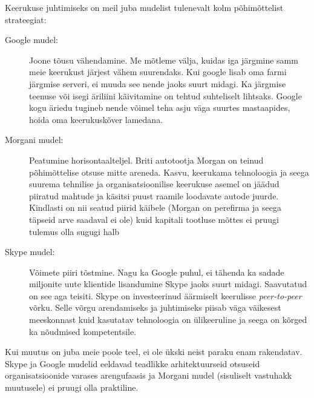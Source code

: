 Keerukuse juhtimiseks on meil juba mudelist tulenevalt kolm põhimõttelist strateegiat:
	\begin{description}
		\item[Google mudel:] Joone tõusu vähendamine. Me mõtleme välja, kuidas iga järgmine samm meie keerukust järjest vähem suurendaks. Kui google lisab oma farmi järgmise serveri, ei muuda see nende jaoks suurt midagi. Ka järgmise teenuse või isegi äriliini käivitamine on tehtud suhteliselt lihtsaks. Google kogu äriedu tugineb nende võimel teha asju väga suurtes mastaapides, hoida oma keerukuskõver lamedana.
		\item[Morgani mudel:] Peatumine horisontaalteljel. Briti autotootja Morgan on teinud põhimõttelise otsuse mitte areneda. Kasvu, keerukama tehnoloogia ja seega suurema tehnilise ja organisatsioonilise keerukuse asemel on jäädud piiratud mahtude ja käsitsi puust raamile loodavate autode juurde. Kindlasti on nii seatud piirid käibele (Morgan on perefirma ja seega täpseid arve saadaval ei ole) kuid kapitali tootluse mõttes ei pruugi tulemus olla sugugi halb
		\item[Skype mudel:] Võimete piiri tõstmine. Nagu ka Google puhul, ei tähenda ka sadade miljonite uute klientide lisandumine Skype jaoks suurt midagi. Saavutatud on see aga teisiti. Skype on investeerinud äärmiselt keerulisse \emph{peer-to-peer} võrku. Selle võrgu arendamiseks ja juhtimiseks piisab väga väikesest meeskonnast kuid kasutatav tehnoloogia on ülikeeruline ja seega on kõrged ka nõudmised kompetentsile.
	\end{description}

Kui muutus on juba meie poole teel, ei ole ükski neist paraku enam rakendatav. Skype ja Google mudelid eeldavad teadlikke arhitektuurseid otsuseid organisatsioonide varases arengufaasis ja Morgani mudel (sisuliselt vastuhakk muutusele) ei pruugi olla praktiline. 

